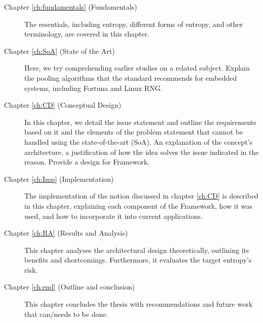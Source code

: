 \begin{description}
	\item[Chapter \ref{ch:fundamentals} (Fundamentals)] The essentials, including entropy, different forms of entropy, and other terminology, are covered in this chapter.
	
	\item[Chapter \ref{ch:SoA} (State of the Art)] Here, we try comprehending earlier studies on a related subject. Explain the pooling algorithms that the standard recommends for embedded systems, including Fortuna and Linux RNG.
	
	\item[Chapter \ref{ch:CD} (Conceptual Design)] In this chapter, we detail the issue statement and outline the requirements based on it and the elements of the problem statement that cannot be handled using the state-of-the-art (SoA). An explanation of the concept’s architecture, a justification of how the idea solves the issue indicated in the reason. Provide a design for Framework.
	
	\item[Chapter \ref{ch:Imp} (Implementation)] The implementation of the notion discussed in chapter \ref{ch:CD} is described in this chapter, explaining each component of the Framework, how it was used, and how to incorporate it into current applications.
	
	\item[Chapter \ref{ch:RA} (Results and Analysis)] This chapter analyses the architectural design theoretically, outlining its benefits and shortcomings. Furthermore, it evaluates the target entropy’s risk.
	
	\item[Chapter \ref{ch:end} (Outline and conclusion)] This chapter concludes the thesis with recommendations and future work that can/needs to be done.
\end{description}


